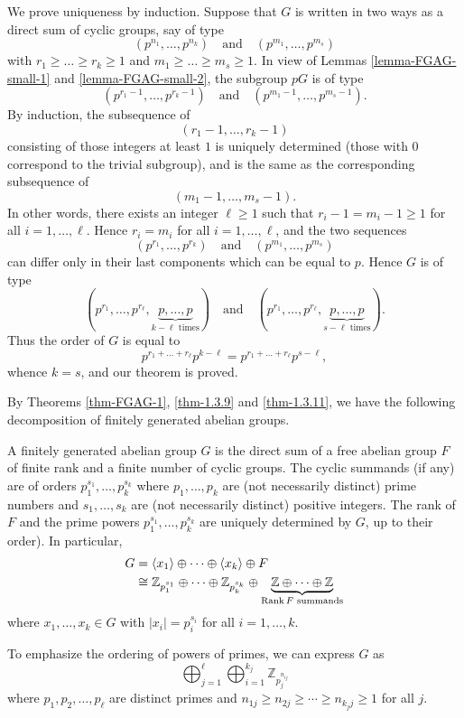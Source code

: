 \begin{sketch}
	We prove uniqueness by induction. Suppose that $G$ is written in two ways as a direct sum of cyclic groups, say of type
	$$ (p^{n_1}, \dots, p^{n_k}) \quad \text{and} \quad (p^{m_1}, \dots, p^{m_s}) $$
	with $r_1 \ge \dots \ge r_k \ge 1$ and $m_1 \ge \dots \ge m_s \ge 1$. In view of Lemmas \ref{lemma-FGAG-small-1} and \ref{lemma-FGAG-small-2}, the subgroup $pG$  is of type
	$$ (p^{r_1-1}, \dots, p^{r_k-1}) \quad \text{and} \quad (p^{m_1-1}, \dots, p^{m_s-1}). $$
By induction, the subsequence of
	$$ (r_1-1, \dots, r_k-1) $$
	consisting of those integers at least $1$ is uniquely determined (those with $0$ correspond to the trivial subgroup), and is the same as the corresponding subsequence of
	$$ (m_1-1, \dots, m_s-1). $$
	In other words, there exists an integer $\ell \geq 1$ such that $r_i-1 = m_i-1\geq 1$ for all $i=1,\dots, \ell$. Hence $r_i = m_i$ for all $i=1,\dots, \ell$, and the two sequences
	$$ (p^{r_1}, \dots, p^{r_k}) \quad \text{and} \quad (p^{m_1}, \dots, p^{m_s}) $$
	can differ only in their last components which can be equal to $p$. Hence $G$ is of type
	$$ (p^{r_1}, \dots, p^{r_\ell}, \underbrace{p, \dots, p}_{k-\ell \text{ times}}) \quad \text{and} \quad (p^{r_1}, \dots, p^{r_\ell}, \underbrace{p, \dots, p}_{s-\ell \text{ times}}). $$
	Thus the order of $G$ is equal to
	$$ p^{r_1 + \dots + r_\ell} p^{k-\ell} = p^{r_1 + \dots + r_\ell} p^{s-\ell}, $$
	whence $k = s$, and our theorem is proved.
\end{sketch}

By Theorems \ref{thm-FGAG-1}, \ref{thm-1.3.9} and \ref{thm-1.3.11}, we have the following decomposition of finitely generated abelian groups.
\begin{theorem} \label{thm-decomposition-of-AG-elem-div}
	A finitely generated abelian group $G$ is the direct sum of a free abelian group $F$ of finite rank and a finite number of
	cyclic groups. The cyclic summands (if any) are of orders $p_1^{s_1},\dots, p_k^{s_k}$ 
	where $p_1, \dots , p_k$ are (not necessarily distinct) prime numbers and $s_1, \dots , s_k$ are (not
	necessarily distinct) positive integers. The rank of $F$ and the prime powers $p_1^{s_1},\dots, p_k^{s_k}$ are uniquely determined by $G$, up to their order). In particular,
	\begin{align*}
		G&= \langle x_1 \rangle\oplus \cdots \oplus \langle x_k \rangle\oplus F\\
		&\cong \mathbb{Z}_{p_1^{s_1}}\oplus \cdots \oplus \mathbb{Z}_{p_k^{s_k}}\oplus \underbrace{\mathbb{Z} \oplus \cdots \oplus \mathbb{Z}}_{\operatorname{Rank}  F \text{ summands}}
	\end{align*}
	where $x_1,\dots, x_k\in G$ with $|x_i| = p_i^{s_i}$ for all $i=1,\dots, k$.
\end{theorem}
\begin{remark}
	To emphasize the ordering of powers of primes, we can express $G$ as
	\begin{equation*}
		\bigoplus_{j=1}^\ell \bigoplus_{i=1}^{k_{j}} \mathbb{Z}_{p_j^{n_{ij}}}
	\end{equation*}
	where $p_1,p_2,\dots, p_\ell$ are distinct primes and $n_{1j}\geq n_{2j}\geq \cdots \geq n_{k_j j}\geq 1$ for all $j$.
\end{remark}


